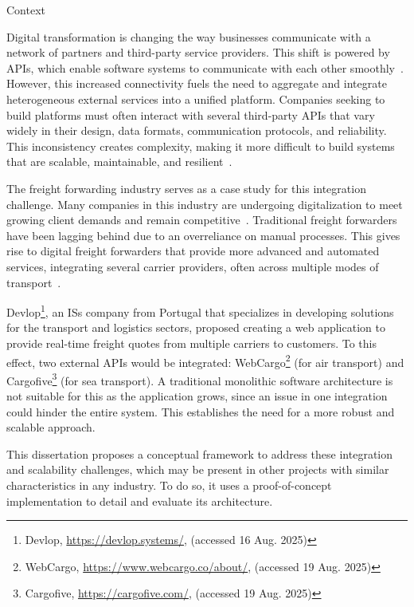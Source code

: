 \documentclass[12pt, reqno, oneside]{amsbook}
\makeatletter
\def\section{\@startsection{section}{1}%
      \z@{.5\linespacing\@plus.7\linespacing}{.25\linespacing}%
      {\normalfont\bfseries\flushleft}}
\theoremstyle{definition}
\theoremstyle{definition}
\numberwithin{section}{chapter}
\numberwithin{table}{chapter}
\numberwithin{figure}{chapter}
\makeatother
\begin{document}
\section{Context}
\label{Section:Context}

Digital transformation is changing the way businesses communicate with a network of partners and third-party service providers. This shift is powered by \acp{API}, which enable software systems to communicate with each other smoothly~\cite{Hunturu2023}. However, this increased connectivity fuels the need to aggregate and integrate heterogeneous external services into a unified platform. Companies seeking to build platforms must often interact with several third-party \acp{API} that vary widely in their design, data formats, communication protocols, and reliability. This inconsistency creates complexity, making it more difficult to build systems that are scalable, maintainable, and resilient~\cite{Huf2019}.

The freight forwarding industry serves as a case study for this integration challenge. Many companies in this industry are undergoing digitalization to meet growing client demands and remain competitive~\cite{Wang2021}. Traditional freight forwarders have been lagging behind due to an overreliance on manual processes. This gives rise to digital freight forwarders that provide more advanced and automated services, integrating several carrier providers, often across multiple modes of transport~\cite{Sullivan2021}.

Devlop\footnote{Devlop, \url{https://devlop.systems/}, (accessed 16 Aug. 2025)}, an \acp{IS} company from Portugal that specializes in developing solutions for the transport and logistics sectors, proposed creating a web application to provide real-time freight quotes from multiple carriers to customers. To this effect, two external \acp{API} would be integrated: WebCargo\footnote{WebCargo, \url{https://www.webcargo.co/about/}, (accessed 19 Aug. 2025)} (for air transport) and Cargofive\footnote{Cargofive, \url{https://cargofive.com/}, (accessed 19 Aug. 2025)} (for sea transport). A traditional monolithic software architecture is not suitable for this as the application grows, since an issue in one integration could hinder the entire system. This establishes the need for a more robust and scalable approach.

This dissertation proposes a conceptual framework to address these integration and scalability challenges, which may be present in other projects with similar characteristics in any industry. To do so, it uses a proof-of-concept implementation to detail and evaluate its architecture.
\end{document}
